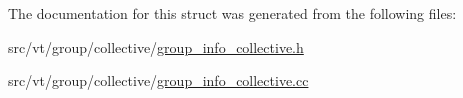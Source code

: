 The documentation for this struct was generated from the following files\+:\begin{DoxyCompactItemize}
\item 
src/vt/group/collective/\hyperlink{group__info__collective_8h}{group\+\_\+info\+\_\+collective.\+h}\item 
src/vt/group/collective/\hyperlink{group__info__collective_8cc}{group\+\_\+info\+\_\+collective.\+cc}\end{DoxyCompactItemize}
